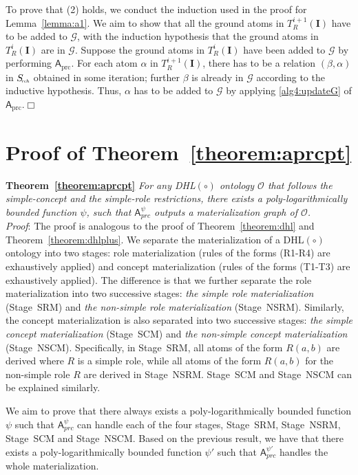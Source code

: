 To prove that (2) holds, we conduct the induction used in the proof for Lemma~\ref{lemma:a1}.
We aim to show that all the ground atoms in $T_R^{i+1}(\textbf{I})$ have to be added to $\mathcal{G}$,
with the induction hypothesis that the ground atoms in $T_R^{i}(\textbf{I})$ are in $\mathcal{G}$.
Suppose the ground atoms in $T_R^{i}(\textbf{I})$ have been added to $\mathcal{G}$ by
performing $\mathsf{A}_{\text{prc}}$.
For each atom $\alpha$ in $T_R^{i+1}(\textbf{I})$, there has to be a relation $(\beta,\alpha)$
in $S_{\textit{\!\tiny rch}}$ obtained in some iteration; further
$\beta$ is already in $\mathcal{G}$ according to the inductive hypothesis. Thus,
$\alpha$ has to be added to $\mathcal{G}$ by applying \ref{alg4:updateG}
of $\mathsf{A}_{\text{prc}}$.\hfill$\Box$


\section{Proof of Theorem~\ref{theorem:aprcpt}}

\textbf{Theorem~\ref{theorem:aprcpt}}
\emph{For any DHL$(\circ)$ ontology $\mathcal{O}$ that follows the simple-concept and the simple-role
restrictions,
there exists a poly-logarithmically bounded function $\psi$,
such that $\mathsf{A}_{prc}^{\psi}$ outputs
a materialization graph of $\mathcal{O}$.}\\

\noindent\emph{Proof}: The proof is analogous to the proof of
Theorem~\ref{theorem:dhl} and Theorem~\ref{theorem:dhlplus}.
We separate the materialization of a DHL$(\circ)$ ontology
into two stages: role materialization (rules
of the forms (R1-R4) are exhaustively applied) and concept materialization
(rules of the forms (T1-T3)
are exhaustively applied). The difference is that we further separate the role materialization
into two successive stages: \emph{the simple role materialization} (Stage~SRM) and
\emph{the non-simple role materialization} (Stage~NSRM).
Similarly, the concept materialization is also separated into two
successive stages:
\emph{the simple concept materialization} (Stage~SCM) and
\emph{the non-simple concept materialization} (Stage~NSCM).
Specifically, in Stage~SRM, all atoms of the form $R(a,b)$ are derived
where $R$ is a simple role, while all atoms of the form $R(a,b)$ for the non-simple
role $R$ are derived in Stage~NSRM. Stage~SCM and Stage~NSCM can be explained similarly.

We aim to prove that there always exists a poly-logarithmically bounded function $\psi$
such that $\mathsf{A}_{prc}^{\psi}$ can handle each of the four stages, Stage~SRM,
Stage~NSRM, Stage~SCM and Stage~NSCM. Based on the previous result, we have that
there exists a poly-logarithmically bounded function $\psi'$
such that $\mathsf{A}_{prc}^{\psi'}$ handles the whole materialization.

